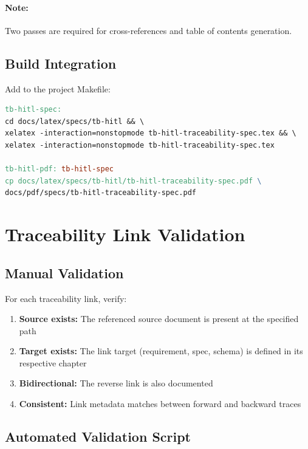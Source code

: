 \documentclass[11pt,a4paper,twoside]{report}
\begin{document}
\paragraph{Note:} Two passes are required for cross-references and
table of contents generation.

\subsection{Build Integration}

Add to the project Makefile:

\begin{lstlisting}[language=make,basicstyle=\ttfamily\small]
tb-hitl-spec:
cd docs/latex/specs/tb-hitl && \
xelatex -interaction=nonstopmode tb-hitl-traceability-spec.tex && \
xelatex -interaction=nonstopmode tb-hitl-traceability-spec.tex

tb-hitl-pdf: tb-hitl-spec
cp docs/latex/specs/tb-hitl/tb-hitl-traceability-spec.pdf \
docs/pdf/specs/tb-hitl-traceability-spec.pdf
\end{lstlisting}

\section{Traceability Link Validation}
\label{sec:link-validation}

\subsection{Manual Validation}

For each traceability link, verify:

\begin{enumerate}
\item \textbf{Source exists:} The referenced source document is present
at the specified path
\item \textbf{Target exists:} The link target (requirement, spec, schema)
is defined in its respective chapter
\item \textbf{Bidirectional:} The reverse link is also documented
\item \textbf{Consistent:} Link metadata matches between forward and
backward traces
\end{enumerate}

\subsection{Automated Validation Script}
\end{document}
